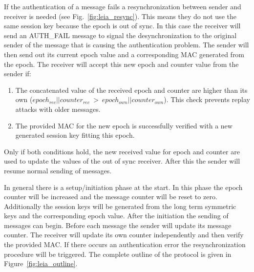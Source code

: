 If the authentication of a message fails a resynchronization between sender and
receiver is needed (see Fig.~\ref{fig:leia_resync}). This means they do not use
the same session key because the epoch is out of sync. In this case the receiver
will send an AUTH\_FAIL message to signal the desynchronization to the original
sender of the message that is causing the authentication problem. The sender
will then send out its current epoch value and a corresponding MAC generated
from the epoch. The receiver will accept this new epoch and counter value from
the sender if:

\begin{enumerate}
    \item The concatenated value of the received epoch and counter are higher
    than its own (\( epoch_{rec} || counter_{rec}~>~epoch_{own} || counter_{own}
    \)). This check prevents replay attacks with older messages. 
    \item The provided MAC for the new epoch is successfully verified with a new
    generated session key fitting this epoch.
\end{enumerate}

Only if both conditions hold, the new received value for epoch and counter are
used to update the values of the out of sync receiver. After this the sender
will resume normal sending of messages. 

In general there is a setup/initiation phase at the start. In this phase the
epoch counter will be increased and the message counter will be reset to zero.
Additionally the session keys will be generated from the long term symmetric
keys and the corresponding epoch value. After the initiation the sending of
messages can begin. Before each message the sender will update its message
counter. The receiver will update its own counter independently and then verify
the provided MAC\@. If there occurs an authentication error the resynchronization
procedure will be triggered. The complete outline of the protocol is given in
Figure~\ref{fig:leia_outline}.

